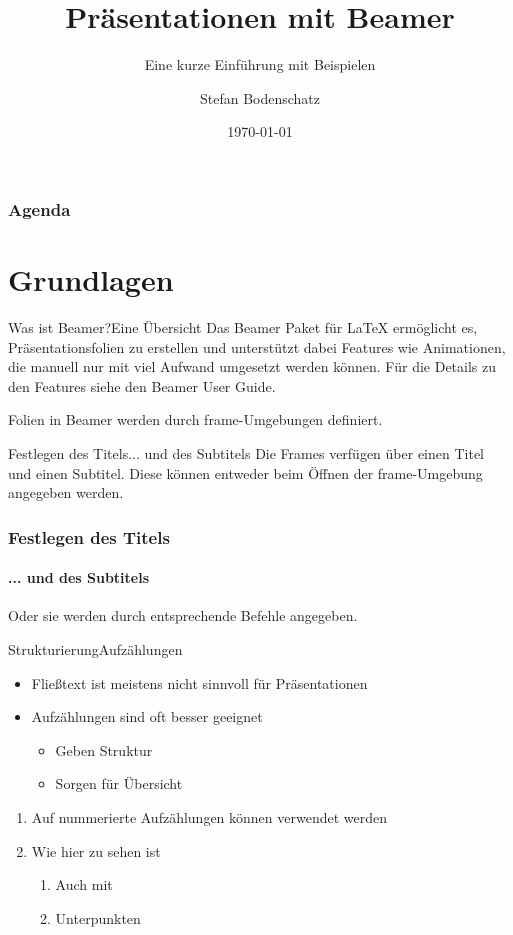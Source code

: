 \documentclass[t,aspectratio=169,dvipsnames]{beamer}
\title{Präsentationen mit Beamer}
\subtitle{Eine kurze Einführung mit Beispielen}
\author{Stefan Bodenschatz}
\institute{Hochschule Trier}
\date{\today}
\begin{document}
\begin{frame}
\titlepage
\end{frame}

\begin{frame}
\frametitle{Agenda}
\tableofcontents
\end{frame}

\section{Grundlagen}
\begin{frame}{Was ist Beamer?}{Eine Übersicht}
Das Beamer Paket für \LaTeX{} ermöglicht es, Präsentationsfolien zu erstellen und unterstützt dabei Features wie Animationen, die manuell nur mit viel Aufwand umgesetzt werden können.
Für die Details zu den Features siehe den Beamer User Guide\cite{BeamerDoc}.
\end{frame}

\begin{frame}
Folien in Beamer werden durch frame-Umgebungen definiert.
\end{frame}

\begin{frame}{Festlegen des Titels}{... und des Subtitels}
Die Frames verfügen über einen Titel und einen Subtitel.
Diese können entweder beim Öffnen der frame-Umgebung angegeben werden.
\end{frame}

\begin{frame}
\frametitle{Festlegen des Titels}
\framesubtitle{... und des Subtitels}
Oder sie werden durch entsprechende Befehle angegeben.
\end{frame}

\begin{frame}{Strukturierung}{Aufzählungen}
\begin{itemize}
	\item Fließtext ist meistens nicht sinnvoll für Präsentationen
	\item Aufzählungen sind oft besser geeignet
	\begin{itemize}
		\item Geben Struktur
		\item Sorgen für Übersicht
	\end{itemize}
\end{itemize}
\begin{enumerate}
	\item Auf nummerierte Aufzählungen können verwendet werden
	\item Wie hier zu sehen ist
	\begin{enumerate}
		\item Auch mit
		\item Unterpunkten
	\end{enumerate} 
\end{enumerate}
\end{frame}
\end{document}
